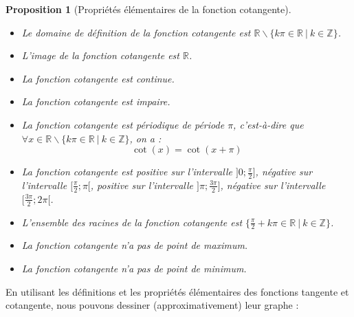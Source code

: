 \documentclass[a4paper,fontsize=13pt]{scrreprt}
\theoremstyle{plain}
\newtheorem{pro}[subsection]{Proposition}
\theoremstyle{definition}
\newcommand{\zz}{\mathbb{Z}}
\newcommand{\rr}{\mathbb{R}}
\begin{document}
\begin{pro} [Propriétés élémentaires de la fonction cotangente] ~\\
\begin{itemize}
\item Le domaine de définition de la fonction cotangente est $\rr \backslash \{k\pi \in \rr ~|~k \in \zz\}$.
\item L'image de la fonction cotangente est $\rr$.
\item La fonction cotangente est continue.
\item La fonction cotangente est impaire.
\item La fonction cotangente est périodique de période $\pi$, c'est-à-dire que \\$\forall x \in \rr \backslash \{k\pi \in \rr ~|~k \in \zz\}$, on a : $$\cot(x) = \cot(x+\pi)$$
\item La fonction cotangente est positive sur l'intervalle $]0;\frac{\pi}{2}]$, négative sur l'intervalle $[\frac{\pi}{2};\pi[$, positive sur l'intervalle $]\pi;\frac{3\pi}{2}]$, négative sur l'intervalle $[\frac{3\pi}{2};2\pi[$.
\item L'ensemble des racines de la fonction cotangente est $\{\frac{\pi}{2}+k\pi \in \rr~|~k \in \zz \}$.
\item La fonction cotangente n'a pas de point de maximum.
\item La fonction cotangente n'a pas de point de minimum.
\end{itemize}
\end{pro}
En utilisant les définitions et les propriétés élémentaires des fonctions tangente et cotangente, nous pouvons dessiner (approximativement) leur graphe :\\
\end{document}
